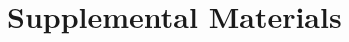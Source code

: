 \documentclass[ openright,titlepage,numbers=noenddot,headinclude,%
                footinclude=true,cleardoublepage=empty,abstractoff, 
                BCOR=5mm,paper=letter,fontsize=11pt,%
                ngerman, american, %
                ]{scrreprt}
\begin{document}
\cleardoublepage
{}
\part{Supplemental Materials}
%
%



%


\cleardoublepage
\cleardoublepage
\end{document}
